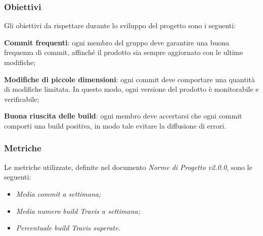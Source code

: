\subsubsection{Obiettivi} 
Gli obiettivi da rispettare durante lo sviluppo del progetto sono i seguenti:
\begin{itemize}
	\item{\textbf{Commit frequenti}: ogni membro del gruppo deve garantire una buona frequenza di commit, affinché il prodotto sia sempre aggiornato con le ultime modifiche;
	\item{\textbf{Modifiche di piccole dimensioni}: ogni commit deve comportare una quantità di modifiche limitata. In questo modo, ogni versione del prodotto è monitorabile e verificabile;}
	\item{\textbf{Buona riuscita delle build}: ogni membro deve accertarsi che ogni commit comporti una build positiva, in modo tale evitare la diffusione di errori.}
	}
\end{itemize}
\subsubsection{Metriche}
Le metriche utilizzate, definite nel documento \emph{Norme di Progetto v2.0.0}, sono le seguenti:
\begin{itemize}
	\item\emph{Media commit a settimana;}
	\item\emph{Media numero build Travis a settimana;}
	\item\emph{Percentuale build Travis superate.}
\end{itemize}

